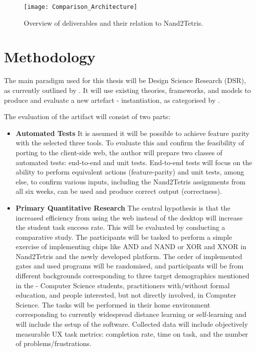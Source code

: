 \documentclass[a4paper,12pt]{report}
\begin{document}
\begin{figure}[h!]
    \centering
    \texttt{[image: Comparison\_Architecture]}
    \caption{Overview of deliverables and their relation to Nand2Tetris.}
\end{figure}

\section{Methodology}

The main paradigm used for this thesis will be Design Science Research (DSR), as currently outlined by \textcite{brocke2020designscience}.
It will use existing theories, frameworks, and models to produce and evaluate a new artefact - instantiation, as categorised by \textcite{hevner2004designscience}.

The evaluation of the artifact will consist of two parts:

\begin{itemize}
    \item \textbf{Automated Tests}
    It is assumed it will be possible to achieve feature parity with the selected three tools.
    To evaluate this and confirm the feasibility of porting to the client-side web, the author will prepare two classes of automated tests: end-to-end and unit tests.
    End-to-end tests will focus on the ability to perform equivalent actions (feature-parity) and unit tests, among else, to confirm various inputs, including the Nand2Tetris assignments from all six weeks, can be used and produce correct output (correctness).
    \item \textbf{Primary Quantitative Research}
    The central hypothesis is that the increased efficiency from using the web instead of the desktop will increase the student task success rate.
    This will be evaluated by conducting a comparative study.
    The participants will be tasked to perform a simple exercise of implementing chips like AND and NAND or XOR and XNOR in Nand2Tetris and the newly developed platform.
    The order of implemented gates and used programs will be randomised, and participants will be from different backgrounds corresponding to three target demographics mentioned in the  - Computer Science students, practitioners with/without formal education, and people interested, but not directly involved, in Computer Science.
    The tasks will be performed in their home environment corresponding to currently widespread distance learning or self-learning and will include the setup of the software.
    Collected data will include objectively measurable UX task metrics: completion rate, time on task, and the number of problems/frustrations.
\end{itemize}
\end{document}
